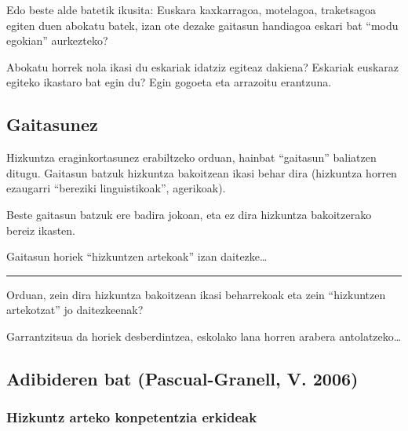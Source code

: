 \documentclass[
]{book}
\begin{document}
Edo beste alde batetik ikusita: Euskara kaxkarragoa, motelagoa, traketsagoa egiten duen abokatu batek, izan ote dezake gaitasun handiagoa eskari bat ``modu egokian'' aurkezteko?

Abokatu horrek nola ikasi du eskariak idatziz egiteaz dakiena? Eskariak euskaraz egiteko ikastaro bat egin du? Egin gogoeta eta arrazoitu erantzuna.

\hypertarget{gaitasunez}{%
\subsection{Gaitasunez}\label{gaitasunez}}

Hizkuntza eraginkortasunez erabiltzeko orduan, hainbat ``gaitasun'' baliatzen ditugu.
Gaitasun batzuk hizkuntza bakoitzean ikasi behar dira (hizkuntza horren ezaugarri ``bereziki linguistikoak'', agerikoak).

Beste gaitasun batzuk ere badira jokoan, eta ez dira hizkuntza bakoitzerako bereiz ikasten.

Gaitasun horiek ``hizkuntzen artekoak'' izan daitezke\ldots{}

\begin{center}\rule{0.5\linewidth}{0.5pt}\end{center}

Orduan, zein dira hizkuntza bakoitzean ikasi beharrekoak eta zein ``hizkuntzen artekotzat'' jo daitezkeenak?

Garrantzitsua da horiek desberdintzea, eskolako lana horren arabera antolatzeko\ldots{}

\hypertarget{adibideren-bat-pascual-granell-v.-2006}{%
\subsection{Adibideren bat (Pascual-Granell, V. 2006)}\label{adibideren-bat-pascual-granell-v.-2006}}

\hypertarget{hizkuntz-arteko-konpetentzia-erkideak}{%
\subsubsection{Hizkuntz arteko konpetentzia erkideak}\label{hizkuntz-arteko-konpetentzia-erkideak}}
\end{document}

